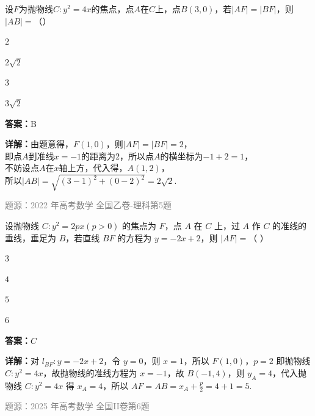 \begin{question}
设$F$为抛物线$C: y^2 = 4x$的焦点，点$A$在$C$上，点$B(3, 0)$，若$|AF| = |BF|$，则$|AB| =$（\qquad）
\begin{choices}
\item $2$
\item $2\sqrt{2}$
\item $3$
\item $3\sqrt{2}$
\end{choices}
\begin{solution}
\textbf{答案：}B

\textbf{详解：}由题意得，$F(1,0)$，则$|AF| = |BF| = 2$，\\即点$A$到准线$x=-1$的距离为2，所以点$A$的横坐标为$-1+2=1$，\\不妨设点$A$在$x$轴上方，代入得，$A(1,2)$，\\所以$|AB| = \sqrt{(3-1)^2 + (0-2)^2} = 2\sqrt{2}$.

\textcolor{gray}{\footnotesize 题源：2022 年高考数学 全国乙卷-理科第5题}
\end{solution}
\end{question}

\begin{question}
设抛物线 $C:y^2=2px(p>0)$ 的焦点为 $F$，点 $A$ 在 $C$ 上，过 $A$ 作 $C$ 的准线的垂线，垂足为 $B$，若直线 $BF$ 的方程为 $y=-2x+2$，则 $|AF|=$（ ）
\begin{choices}
\item $3$
\item $4$
\item $5$
\item $6$
\end{choices}
\begin{solution}
\textbf{答案：}$C$

\textbf{详解：}对 $l_{BF}:y=-2x+2$，令 $y=0$，则 $x=1$，所以 $F(1,0)$，$p=2$ 即抛物线 $C:y^2=4x$，故抛物线的准线方程为 $x=-1$，故 $B(-1,4)$，则 $y_A=4$，代入抛物线 $C:y^2=4x$ 得 $x_A=4$，所以 $AF=AB=x_A+\frac{p}{2}=4+1=5$.

\textcolor{gray}{\footnotesize 题源：2025 年高考数学 全国II卷第6题}
\end{solution}
\end{question}


